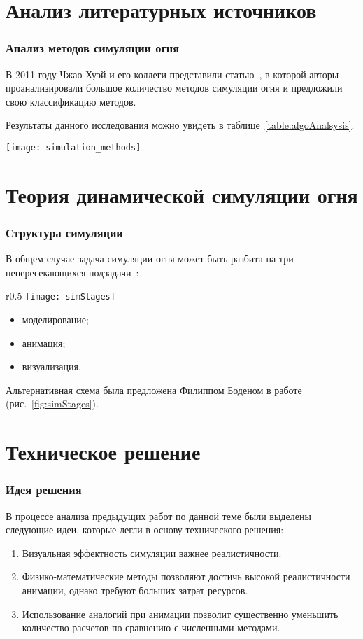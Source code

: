 \section{Анализ литературных источников}
\begin{frame}
\frametitle{Анализ методов симуляции огня}
В 2011 году Чжао Хуэй и его коллеги представили статью~\cite{survey}, в которой
авторы проанализировали большое количество методов симуляции огня и предложили
свою классификацию методов.

Результаты данного исследования можно увидеть в
таблице~\ref{table:algoAnalsysis}.
\begin{table}[htb]
    \caption{Сравнение производительности различных методов симуляции огня}
    \texttt{[image: simulation\_methods]}%
    \label{table:algoAnalsysis}
\end{table}
\end{frame}

\section{Теория динамической симуляции огня}
\begin{frame}
\frametitle{Структура симуляции}
В общем случае задача симуляции огня может быть разбита на три
непересекающихся подзадачи~\cite{Perry94synthesizingflames}:
\begin{wrapfigure}{r}{0.5\textwidth}
	\centering
    \texttt{[image: simStages]}
    \caption{Структура симуляции, предложенная в~\cite{realistic_sim}}%
    \label{fig:simStages}
\end{wrapfigure}
\begin{itemize}
	\item моделирование;
	\item анимация;
	\item визуализация.
\end{itemize}
Альтернативная схема была предложена Филиппом Боденом в
работе~\cite{realistic_sim} (рис.~\ref{fig:simStages}).
\end{frame}

\section{Техническое решение}
\begin{frame}
\frametitle{Идея решения}
В процессе анализа предыдущих работ по данной теме были выделены следующие идеи,
которые легли в основу технического решения:
\begin{enumerate}
    \item Визуальная эффектность симуляции важнее реалистичности.
    \item Физико-математические методы позволяют достичь высокой реалистичности
        анимации, однако требуют больших затрат ресурсов.
    \item Использование аналогий при анимации позволит существенно
        уменьшить количество расчетов по сравнению с численными методами.
\end{enumerate}
\end{frame}

